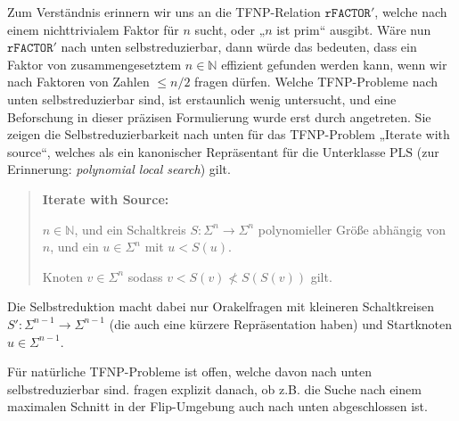 Zum Verständnis erinnern wir uns an die TFNP-Relation $\mathtt{rFACTOR}'$, welche nach einem nichttrivialem Faktor für $n$ sucht, oder „$n$ ist prim“ ausgibt. Wäre nun $\mathtt{rFACTOR}'$  nach unten selbstreduzierbar, dann würde das bedeuten, dass ein Faktor von zusammengesetztem $n\in\mathbb N$ effizient gefunden werden kann, wenn wir nach Faktoren von Zahlen $\leq n/2$ fragen dürfen.
Welche TFNP-Probleme nach unten selbstreduzierbar sind, ist erstaunlich wenig untersucht, und eine Beforschung in dieser präzisen Formulierung wurde erst durch \textcite{harsha_downward_2023} angetreten.
Sie zeigen die Selbstreduzierbarkeit nach unten für das TFNP-Problem „Iterate with source“, welches als ein kanonischer Repräsentant für die Unterklasse $\mathrm{PLS}$ (zur Erinnerung: \emph{polynomial local search}) gilt.
\begin{quote}
    \textbf{Iterate with Source:}
    \begin{description}[nosep]
        \item[Gegeben:] $n\in\mathbb N$, und ein Schaltkreis $S\colon\Sigma^n\to\Sigma^n$ polynomieller Größe abhängig von $n$, und ein $u\in\Sigma^n$ mit $u<S(u)$. 
        \item[Gesucht:] Knoten $v\in\Sigma^n$ sodass $v<S(v)\not < S(S(v))$ gilt.
    \end{description}
\end{quote}
Die Selbstreduktion macht dabei nur Orakelfragen mit kleineren Schaltkreisen $S'\colon\allowbreak\Sigma^{n-1}\to\Sigma^{n-1}$ (die auch eine kürzere Repräsentation haben) und Startknoten $u\in \Sigma^{n-1}$.

Für natürliche  TFNP-Probleme ist offen, welche davon nach unten selbstreduzierbar sind. 
\citeauthor{harsha_downward_2023} fragen explizit danach, ob z.B. die Suche nach einem maximalen Schnitt in der Flip-Umgebung auch nach unten abgeschlossen ist.


